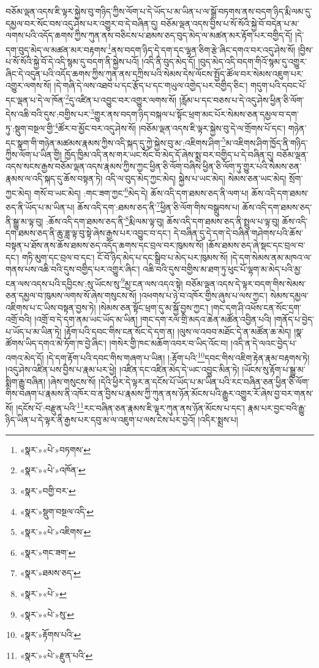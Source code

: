 བཅོམ་ལྡན་འདས་ཇི་ལྟར་སྐྱེས་བུ་གཉིད་ཀྱིས་ལོག་པ་དེ་ཡོད་པ་མ་ཡིན་པ་ལ་སྒྲོ་བཏགས་ནས་བདག་ཉིད་རྨི་ལམ་དུ་དམྱལ་བར་སོང་བས་འདུ་ཤེས་པར་འགྱུར་བ་དེ་བཞིན་དུ། བཅོམ་ལྡན་འདས་བྱིས་པ་སོ་སོའི་སྐྱེ་བོ་བདེན་པ་མ་ལགས་པའི་འདོད་ཆགས་ཀྱིས་ཀུན་ནས་བཅིངས་པ་ཐམས་ཅད་བུད་མེད་ལ་མཚན་མར་རྟོག་པར་བགྱིད་དོ། །དེ་དག་བུད་མེད་ལ་མཚན་མར་བརྟགས་\footnote{«སྣར་»«པེ་»བཏགས་}ནས་བདག་ཉིད་དེ་དག་དང་ལྷན་ཅིག་རྩེ་ཞིང་དགའ་བར་འདུ་ཤེས་སོ། །བྱིས་པ་སོ་སོའི་སྐྱེ་བོ་དེ་འདི་སྙམ་དུ་བདག་ནི་སྐྱེས་པའོ། །འདི་ནི་བུད་མེད་དོ། །བུད་མེད་འདི་བདག་གིའོ་སྙམ་དུ་འགྱུར་ཞིང་དེ་འདུན་པའི་འདོད་ཆགས་ཀྱིས་ཀུན་ནས་དཀྲིས་པའི་སེམས་དེས་ལོངས་སྤྱོད་ཚོལ་བར་སེམས་འཇུག་པར་འགྱུར་ལགས་སོ། །དེ་གཞི་དེ་ལས་འཐབ་པ་དང་རྩོད་པ་དང་གཡུལ་འགྱེད་པར་བགྱིད་ཅིང་། གདུག་པའི་དབང་པོ་དང་ལྡན་པ་དེ་ལ་ཁོན་\footnote{«སྣར་»«པེ་»འཁོན་}དུ་འཛིན་པ་འབྱུང་བར་འགྱུར་ལགས་སོ། །རློམ་པ་དང་བཅས་པ་དེ་འདུ་ཤེས་ཕྱིན་ཅི་ལོག་དེས་འཆི་བའི་དུས་:བགྱིས་པར་\footnote{«སྣར་»བགྱི་བར་}གྱུར་ནས་བདག་ཉིད་བསྐལ་པ་སྟོང་ཕྲག་མང་པོར་སེམས་ཅན་དམྱལ་བ་དག་ཏུ་:སྡུག་བསྔལ་གྱི་\footnote{«སྣར་»སྡུག་བསྔལ་འདི་}ཚོར་བ་མྱོང་བར་འདུ་ཤེས་སོ། །བཅོམ་ལྡན་འདས་ཇི་ལྟར་སྐྱེས་བུ་དེ་ལ་གྲོགས་པོ་དང་། གཉེན་དང་སྣག་གི་གཉེན་མཚམས་རྣམས་ཀྱིས་འདི་སྐད་དུ་ཀྱེ་སྐྱེས་བུ་མ་:འཇིགས་ཤིག་\footnote{«སྣར་»«པེ་»འཇིགས་}མ་འཇིགས་ཤིག་ཁྱོད་ནི་གཉིད་ཀྱིས་ལོག་པ་ཡིན་གྱི། ཁྱོད་ཁྱིམ་འདི་ནས་གར་ཡང་སོང་བ་མེད་དོ་ཞེས་སྨྲ་བར་བགྱིད་པ་དེ་བཞིན་དུ། བཅོམ་ལྡན་འདས་སངས་རྒྱས་བཅོམ་ལྡན་འདས་རྣམས་ཀྱིས་ཀྱང་ཕྱིན་ཅི་ལོག་བཞིས་ཕྱིན་ཅི་ལོག་ཏུ་གྱུར་པའི་སེམས་ཅན་རྣམས་ལ་འདི་སྐད་དུ་ཆོས་བསྟན་ཏེ། འདི་ལ་བུད་མེད་ཀྱང་མེད། སྐྱེས་པ་ཡང་མེད། སེམས་ཅན་ཡང་མེད། སྲོག་ཀྱང་མེད། གསོ་བ་ཡང་མེད། :གང་ཟག་ཀྱང་\footnote{«སྣར་»གང་ཟག་}མེད་དེ། ཆོས་འདི་དག་ཐམས་ཅད་ནི་ལག་པ། ཆོས་འདི་དག་ཐམས་ཅད་ནི་ཡོད་པ་མ་ཡིན་པ། ཆོས་འདི་དག་:ཐམས་ཅད་ནི་\footnote{«སྣར་»ཐམས་ཅད་}ཕྱིན་ཅི་ལོག་གིས་བསྒྲུབས་པ། ཆོས་འདི་དག་ཐམས་ཅད་ནི་སྒྱུ་མ་ལྟ་བུ། :ཆོས་འདི་དག་ཐམས་ཅད་ནི་\footnote{«སྣར་»«པེ་»}རྨི་ལམ་ལྟ་བུ། ཆོས་འདི་དག་ཐམས་ཅད་ནི་སྤྲུལ་པ་ལྟ་བུ། ཆོས་འདི་དག་ཐམས་ཅད་ནི་ཆུ་ཟླ་ལྟ་བུ་སྟེ་ཞེས་རྒྱས་པར་འབྱུང་བ་དང་། དེ་བཞིན་དུ་དེ་དག་དེ་བཞིན་གཤེགས་པའི་ཆོས་བསྟན་པ་ཐོས་ནས་ཆོས་ཐམས་ཅད་འདོད་ཆགས་དང་བྲལ་བར་ཁུམས་སོ། །ཆོས་ཐམས་ཅད་ཞེ་སྡང་དང་བྲལ་བ་དང་། གཏི་མུག་དང་བྲལ་བ་དང་། ངོ་བོ་ཉིད་མེད་པ་དང་སྒྲིབ་པ་མེད་པར་ཁུམས་སོ། །དེ་དག་སེམས་ནམ་མཁའ་ལ་གནས་པས་འཆི་བའི་དུས་བགྱིད་པར་འགྱུར་ཞིང་། འཆི་བའི་དུས་བགྱིས་མ་ཐག་ཏུ་ཕུང་པོ་ལྷག་མ་མེད་པའི་མྱ་ངན་ལས་འདས་པའི་དབྱིངས་:སུ་ཡོངས་སུ་\footnote{«སྣར་»«པེ་»སུ་}མྱ་ངན་ལས་འདའ་སྟེ། བཅོམ་ལྡན་འདས་དེ་ལྟར་བདག་གིས་སེམས་ཅན་དམྱལ་བ་ཁུམས་ལགས་སོ་ཞེས་གསུངས་སོ། །འཕགས་པ་ཉེ་བ་འཁོར་གྱིས་ཞུས་པ་ལས་ཀྱང་། སེམས་དམྱལ་འཇིགས་པ་ང་ཡིས་བསྟན་བྱས་ཏེ། །སེམས་ཅན་སྟོང་ཕྲག་དུ་མ་སྐྱོ་བྱས་ཀྱང་། །གང་དག་ཤི་འཕོས་ངན་སོང་དྲག་འགྲོ་བའི། །འགྲོ་བ་དེ་དག་ནམ་ཡང་ཡོད་མ་ཡིན། །གང་དག་རལ་གྲི་མདའ་ཆེན་མཚོན་འབྱིན་པའི། །གནོད་པ་བྱེད་པ་ཡོད་པ་མ་ཡིན་ཏེ། །རྟོག་པའི་དབང་གིས་ངན་སོང་དེ་དག་ན། །ལུས་ལ་འབབ་མཐོང་དེ་ན་མཚོན་ཆ་མེད། །སྣ་ཚོགས་ཡིད་དགའ་མེ་ཏོག་ཁ་བྱེ་ཞིང་། །གསེར་གྱི་ཁང་མཆོག་འབར་བ་ཡིད་འོང་བ། །འདི་ན་དེ་ལའང་བྱེད་པ་འགའ་མེད་དོ། །དེ་དག་རྟོག་པའི་དབང་གིས་གཞག་པ་ཡིན། །:རྟོག་པའི་\footnote{«སྣར་»རྟོགས་པའི་}དབང་གིས་འཇིག་རྟེན་རྣམ་བརྟགས་ཏེ། །འདུ་ཤེས་འཛིན་པས་བྱིས་པ་རྣམ་པར་ཕྱེ། །འཛིན་དང་འཛིན་མེད་དེ་ཡང་འབྱུང་མིན་ཏེ། །ཡོངས་སུ་རྟོག་པ་སྒྱུ་མ་སྨིག་རྒྱུ་བཞིན། །ཞེས་གསུངས་སོ། །དེའི་ཕྱིར་དེ་ལྟར་ན་དངོས་པོ་ཡོད་པ་མ་ཡིན་པའི་རང་བཞིན་ཅན་ཕྱིན་ཅི་ལོག་གིས་བཞག་པ་རྣམས་ནི་འཁོར་བ་ན་བྱིས་པ་རྣམས་ཀྱི་ཀུན་ནས་ཉོན་མོངས་པའི་རྒྱུར་འགྱུར་རོ་ཞེས་བྱ་བར་གནས་སོ། །དངོས་པོ་:བརྫུན་པའི་\footnote{«སྣར་»«པེ་»རྫུན་པའི་}རང་བཞིན་ཅན་རྣམས་ཇི་ལྟར་ཀུན་ནས་ཉོན་མོངས་པ་དང་། རྣམ་པར་བྱང་བའི་རྒྱུ་ཉིད་ཡིན་པ་དེ་ལྟར་ནི་རྒྱས་པར་དབུ་མ་ལ་འཇུག་པ་ལས་ངེས་པར་བྱའོ། །འདིར་སྨྲས་པ། 